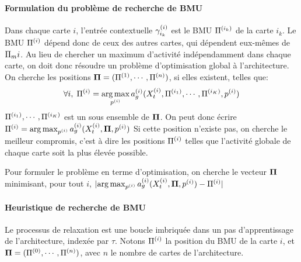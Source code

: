 \paragraph{Formulation du problème de recherche de BMU}
Dans chaque carte $i$, l'entrée contextuelle $\gamma^{({i})}_{i_k}$ est le BMU $\Pi^{({i_k})}$  de la carte $i_k$. Le BMU $\Pi^{({i})}$ dépend donc de ceux des autres cartes, qui dépendent eux-mêmes de $\Pi_m{i}$. Au lieu de chercher un maximum d'activité indépendamment dans chaque carte, on doit donc résoudre un problème d'optimisation global à  l'architecture. On cherche les positions $\mathbf{\Pi} = (\Pi^{({1})}, \cdots, \Pi^{({n})})$, si elles existent, telles que:
\begin{equation}
\forall i, \; \Pi^{({i})} = \operatorname*{arg\,max}_{p^{({i})}} a_g^{({i})}(X^{({i})}_t, \Pi^{({i_1})}, \cdots, \Pi^{({i_K})},p^{({i})})
\end{equation}
$\Pi^{({i_1})}, \cdots, \Pi^{({i_K})}$ est un sous ensemble de $\mathbf{\Pi}$. On peut donc écrire $\Pi^{({i})} = \operatorname*{arg\,max}_{p^{({i})}} a_g^{({i})}(X^{({i})}_t, \mathbf{\Pi}, p^{({i})})$
Si cette position n'existe pas, on cherche le meilleur compromis, c'est à dire les positions $\Pi^{({i})}$ telles que l'activité globale de chaque carte soit la plus élevée possible.


Pour formuler le problème en terme d'optimisation, on cherche le vecteur $\mathbf{\Pi}$ minimisant, pour tout $i$, $\lvert \operatorname*{arg\,max}_{p^{({i})}} a_g^{({i})}(X^{({i})}_t, \mathbf{\Pi}, p^{({i})}) - \Pi^{({i})} \rvert$

\paragraph{Heuristique de recherche de BMU}
Le processus de relaxation est une boucle imbriquée dans un pas d'apprentissage de l'architecture, indexée par $\tau$. Notons $\Pi^{({i})}$ la position du BMU de la carte $i$, et $\mathbf{\Pi} = (\Pi^{({0})}, \cdots , \Pi^{({n})})$, avec $n$ le nombre de cartes de l'architecture.

